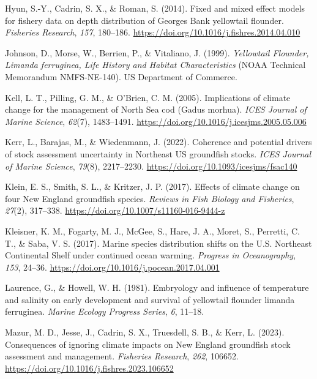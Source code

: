 \documentclass[
  12pt,
]{article}
\newlength{\cslhangindent}
\newenvironment{CSLReferences}[2] %
 {\begin{list}{}{%
  \setlength{\itemindent}{0pt}
  \setlength{\leftmargin}{0pt}
  \setlength{\parsep}{0pt}
  \ifodd #1
   \setlength{\leftmargin}{\cslhangindent}
   \setlength{\itemindent}{-1\cslhangindent}
  \fi
  \setlength{\itemsep}{#2\baselineskip}}}
 {\end{list}}
\begin{document}
\begin{CSLReferences}{1}{2}
Hyun, S.-Y., Cadrin, S. X., \& Roman, S. (2014). Fixed and mixed effect models for fishery data on depth distribution of Georges Bank yellowtail flounder. \emph{Fisheries Research}, \emph{157}, 180--186. \url{https://doi.org/10.1016/j.fishres.2014.04.010}

Johnson, D., Morse, W., Berrien, P., \& Vitaliano, J. (1999). \emph{Yellowtail {Flounder}, {Limanda} ferruginea, {Life History} and {Habitat Characteristics}} (NOAA Technical Memorandum NMFS-NE-140). US Department of Commerce.

Kell, L. T., Pilling, G. M., \& O'Brien, C. M. (2005). Implications of climate change for the management of {North Sea} cod ({Gadus} morhua). \emph{ICES Journal of Marine Science}, \emph{62}(7), 1483--1491. \url{https://doi.org/10.1016/j.icesjms.2005.05.006}

Kerr, L., Barajas, M., \& Wiedenmann, J. (2022). Coherence and potential drivers of stock assessment uncertainty in Northeast US groundfish stocks. \emph{ICES Journal of Marine Science}, \emph{79}(8), 2217--2230. \url{https://doi.org/10.1093/icesjms/fsac140}

Klein, E. S., Smith, S. L., \& Kritzer, J. P. (2017). Effects of climate change on four New England groundfish species. \emph{Reviews in Fish Biology and Fisheries}, \emph{27}(2), 317--338. \url{https://doi.org/10.1007/s11160-016-9444-z}

Kleisner, K. M., Fogarty, M. J., McGee, S., Hare, J. A., Moret, S., Perretti, C. T., \& Saba, V. S. (2017). Marine species distribution shifts on the U.S. Northeast Continental Shelf under continued ocean warming. \emph{Progress in Oceanography}, \emph{153}, 24--36. \url{https://doi.org/10.1016/j.pocean.2017.04.001}

Laurence, G., \& Howell, W. H. (1981). Embryology and influence of temperature and salinity on early development and survival of yellowtail flounder limanda ferruginea. \emph{Marine Ecology Progress Series}, \emph{6}, 11--18.

Mazur, M. D., Jesse, J., Cadrin, S. X., Truesdell, S. B., \& Kerr, L. (2023). Consequences of ignoring climate impacts on New England groundfish stock assessment and management. \emph{Fisheries Research}, \emph{262}, 106652. \url{https://doi.org/10.1016/j.fishres.2023.106652}


\end{CSLReferences}
\end{document}
